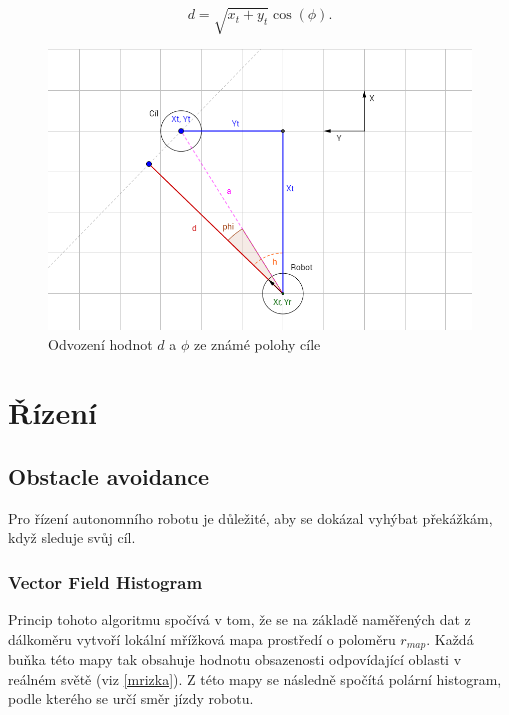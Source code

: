 \documentclass[twoside]{ctuthesis}
\theoremstyle{plain}
\theoremstyle{definition}
\theoremstyle{note}
\begin{document}
\begin{equation}
d = \sqrt{x_t + y_t}\cos(\phi).
\end{equation}
\begin{figure}
	\caption{Odvození hodnot $d$ a $\phi$ ze známé polohy cíle}
	
	\label{inv}
	\includegraphics[width=1\textwidth]{images/2/neco.png}
\end{figure}
\chapter{Řízení}

\section{Obstacle avoidance}

Pro řízení autonomního robotu je důležité, aby se dokázal vyhýbat překážkám, když sleduje svůj cíl. 

\subsection{Vector Field Histogram}



Princip tohoto algoritmu spočívá v tom, že se na základě naměřených dat z dálkoměru vytvoří lokální mřížková mapa prostředí o poloměru $r_{map}$. Každá buňka této mapy tak obsahuje hodnotu obsazenosti odpovídající oblasti v reálném světě (viz \ref{mrizka}). Z této mapy se následně spočítá polární histogram, podle kterého se určí směr jízdy robotu.
\end{document}
